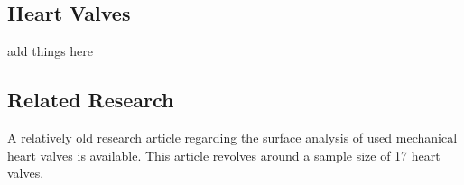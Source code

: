 \subsection*{Heart Valves}
add things here
\subsection*{Related Research}

A relatively old research article regarding the surface analysis of used mechanical heart valves is available. This article revolves around a sample size of 17 heart valves.
\cite*{barmada1998}


\cite*{bjork1971}


\cite*{hutchison2011}


\cite*{venkatesh2013}


\cite*{vansteenbergen2019}


\cite*{wu2001}


\cite*{zhang1995}
